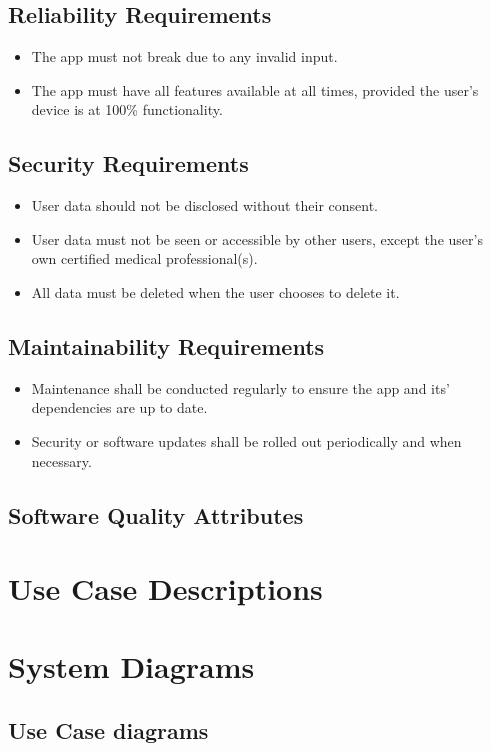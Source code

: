 \documentclass[a4paper]{scrreprt}
\begin{document}
\section{Reliability Requirements}
\begin{itemize}
    \item The app must not break due to any invalid input.
    \item The app must have all features available at all times, provided the user's device is at 100\% functionality.
\end{itemize}
\section{Security Requirements}
\begin{itemize}
    \item User data should not be disclosed without their consent.
    \item User data must not be seen or accessible by other users, except the user's own certified medical professional(s).
    \item All data must be deleted when the user chooses to delete it.
\end{itemize}
\section{Maintainability Requirements}
\begin{itemize}
    \item Maintenance shall be conducted regularly to ensure the app and its' dependencies are up to date.
    \item Security or software updates shall be rolled out periodically and when necessary.
\end{itemize}
\section{Software Quality Attributes}


\chapter{Use Case Descriptions}

\chapter{System Diagrams}
\section{Use Case diagrams}
\end{document}
